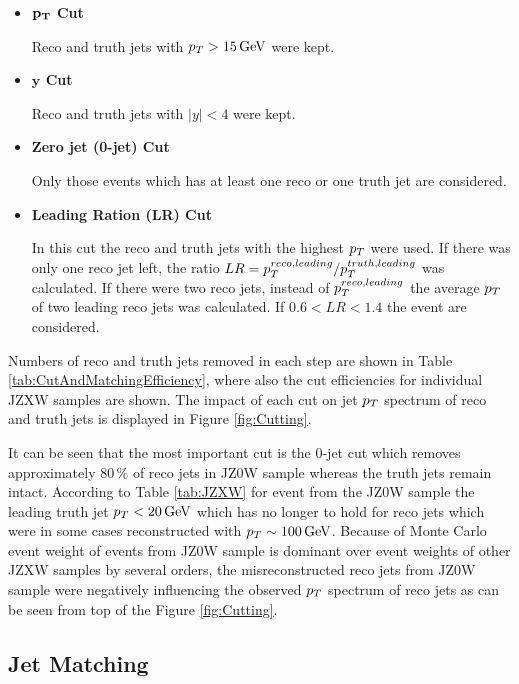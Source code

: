 \begin{itemize}
  \item \textbf{$\mathbf{p_{T}}$ Cut}

    Reco and truth jets with $p_{T} > 15 \,\text{GeV}$ were kept.

  \item \textbf{$\mathbf{y}$ Cut}
    
    Reco and truth jets with $|y| < 4$ were kept.

  \item \textbf{Zero jet (0-jet) Cut}

    Only those events which has at least one reco or one truth jet are
    considered.
    
  \item \textbf{Leading Ration (LR) Cut}

    In this cut the reco and truth jets with the highest $p_{T}$ were used. If
    there was only one reco jet left, the ratio $LR = p_{T}^{reco,leading} /
    p_{T}^{truth,leading}$ was calculated. If there were two reco jets, instead
    of $p_{T}^{reco,leading}$ the average $p_{T}$ of two leading reco jets was
    calculated. If $0.6 < LR < 1.4$ the event are considered.

\end{itemize}

Numbers of reco and truth jets removed in each step are shown in Table
\ref{tab:CutAndMatchingEfficiency}, where also the cut efficiencies for individual
JZXW samples are shown. The impact of each cut on jet $p_{T}$ spectrum of reco
and truth jets is displayed in Figure \ref{fig:Cutting}. 

It can be seen that the most important cut is the 0-jet cut which removes
approximately $80\,\%$ of reco jets in JZ0W sample whereas the truth jets
remain intact. According to Table \ref{tab:JZXW} for event from the JZ0W sample
the leading truth jet $p_{T} < 20 \,\text{GeV}$ which has no longer to hold for reco
jets which were in some cases reconstructed with $p_{T} \sim 100 \,\text{GeV}$. Because of
Monte Carlo event weight of events from JZ0W sample is dominant over event
weights of other JZXW samples by several orders, the misreconstructed reco
jets from JZ0W sample were negatively influencing the observed $p_{T}$ spectrum of
reco jets as can be seen from top of the Figure \ref{fig:Cutting}.

\subsection{Jet Matching}
\label{SubSec:JetMatching}


